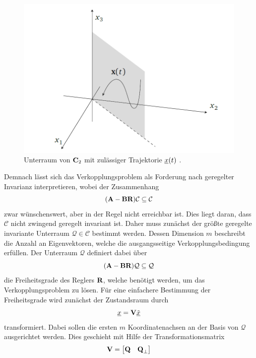 \begin{figure}[h]
	\centering
	\includegraphics[width=\textwidth]{./Bilder/UnterraumTraj.png}
	\caption{Unterraum von $\textbf{C}_{2}$ mit zulässiger Trajektorie $\underline{x}(t)$ \cite{Schaub}.}
	\label{fig:UnterRTraj}
\end{figure}
Demnach lässt sich das Verkopplungsproblem als Forderung nach geregelter Invarianz interpretieren, wobei der Zusammenhang
\begin{equation}
	(\textbf{A}-\textbf{B}\textbf{R})\mathcal{C} \subseteq \mathcal{C}  
\end{equation}
zwar wünschenswert, aber in der Regel nicht erreichbar ist. Dies liegt daran, dass $\mathcal{C}$ nicht zwingend geregelt invariant ist. Daher muss zunächst der größte geregelte invariante Unterraum $\mathcal{Q} \in \mathcal{C}$ bestimmt werden. Dessen Dimension $m$ beschreibt die Anzahl an Eigenvektoren, welche die ausgangsseitige Verkopplungsbedingung erfüllen. 
Der Unterraum $\mathcal{Q}$ definiert dabei über 
\begin{equation}
	(\textbf{A} - \textbf{B}\textbf{R}) \mathcal{Q} \subseteq \mathcal{Q}
\end{equation}
die Freiheitsgrade des Reglers $\textbf{R}$, welche benötigt werden, um das Verkopplungsproblem zu lösen. Für eine einfachere Bestimmung der Freiheitsgrade wird zunächst der Zustandsraum durch
\begin{equation}
	\underline{x} = \textbf{V}\underline{\tilde{x}}
\end{equation}
transformiert.
Dabei sollen die ersten $m$ Koordinatenachsen an der Basis von $\mathcal{Q}$ ausgerichtet werden.
Dies geschieht mit Hilfe der Transformationsmatrix 
\begin{equation}
\textbf{V} =\begin{bmatrix} \textbf{Q}	&\textbf{Q}_{\bot} \end{bmatrix}
\end{equation}
